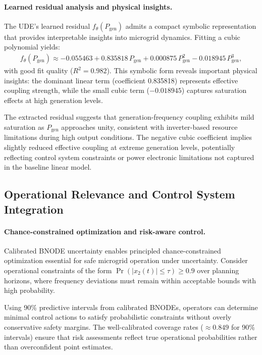 \paragraph{Learned residual analysis and physical insights.} The UDE's learned residual $f_\theta(P_{\text{gen}})$ admits a compact symbolic representation that provides interpretable insights into microgrid dynamics. Fitting a cubic polynomial yields:
\begin{align}
f_\theta(P_{\text{gen}}) \approx -0.055463 + 0.835818\,P_{\text{gen}} + 0.000875\,P_{\text{gen}}^2 - 0.018945\,P_{\text{gen}}^3,
\end{align}
with good fit quality ($R^2 = 0.982$). This symbolic form reveals important physical insights: the dominant linear term (coefficient 0.835818) represents effective coupling strength, while the small cubic term ($-0.018945$) captures saturation effects at high generation levels. %

The extracted residual suggests that generation-frequency coupling exhibits mild saturation as $P_{\text{gen}}$ approaches unity, consistent with inverter-based resource limitations during high output conditions. The negative cubic coefficient implies slightly reduced effective coupling at extreme generation levels, potentially reflecting control system constraints or power electronic limitations not captured in the baseline linear model. %

\subsection{Operational Relevance and Control System Integration}

\paragraph{Chance-constrained optimization and risk-aware control.} Calibrated BNODE uncertainty enables principled chance-constrained optimization essential for safe microgrid operation under uncertainty. Consider operational constraints of the form $\Pr(|x_2(t)| \leq \tau) \geq 0.9$ over planning horizons, where frequency deviations must remain within acceptable bounds with high probability.

Using 90\% predictive intervals from calibrated BNODEs, operators can determine minimal control actions to satisfy probabilistic constraints without overly conservative safety margins. The well-calibrated coverage rates ($\approx 0.849$ for 90\% intervals) ensure that risk assessments reflect true operational probabilities rather than overconfident point estimates. %

